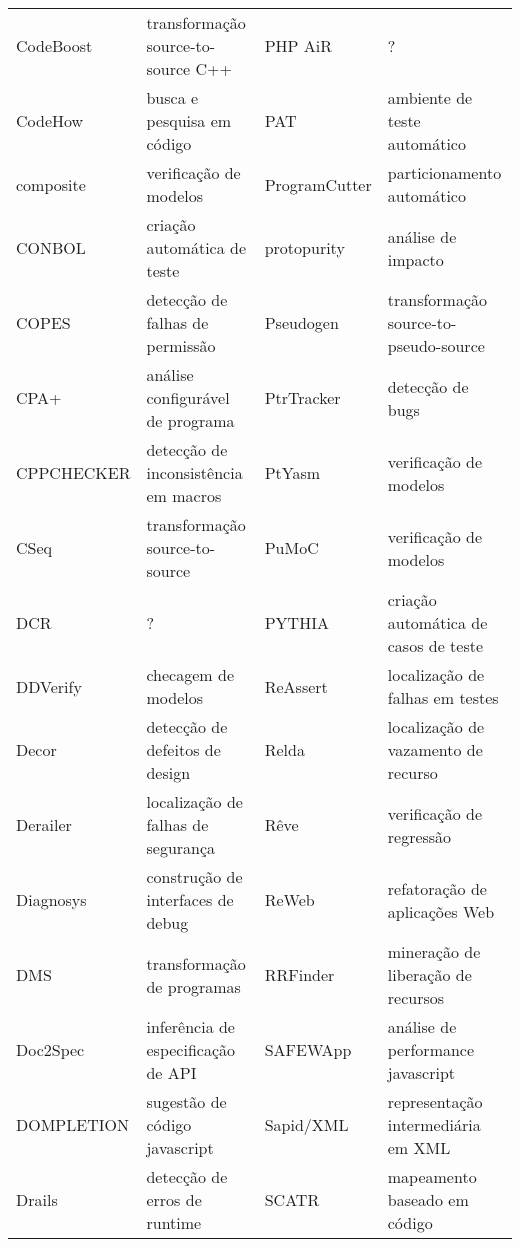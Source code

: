 \begin{table}[h]
{\begin{tabular}{| l | l | l | l |}
  CodeBoost      & transformação source-to-source C++   & PHP AiR          & ?                                    \\
  CodeHow        & busca e pesquisa em código           & PAT              & ambiente de teste automático         \\
  composite      & verificação de modelos               & ProgramCutter    & particionamento automático           \\
  CONBOL         & criação automática de teste          & protopurity      & análise de impacto                   \\
  COPES          & detecção de falhas de permissão      & Pseudogen        & transformação source-to-pseudo-source \\
  CPA+           & análise configurável de programa     & PtrTracker       & detecção de bugs                     \\
  CPPCHECKER     & detecção de inconsistência em macros & PtYasm           & verificação de modelos               \\
  CSeq           & transformação source-to-source       & PuMoC            & verificação de modelos               \\
  DCR            & ?                                    & PYTHIA           & criação automática de casos de teste \\
  DDVerify       & checagem de modelos                  & ReAssert         & localização de falhas em testes      \\
  Decor          & detecção de defeitos de design       & Relda            & localização de vazamento de recurso  \\
  Derailer       & localização de falhas de segurança   & Rêve             & verificação de regressão             \\
  Diagnosys      & construção de interfaces de debug    & ReWeb            & refatoração de aplicações Web        \\
  DMS            & transformação de programas           & RRFinder         & mineração de liberação de recursos   \\
  Doc2Spec       & inferência de especificação de API   & SAFEWApp         & análise de performance javascript    \\
  DOMPLETION     & sugestão de código javascript        & Sapid/XML        & representação intermediária em XML   \\
  Drails         & detecção de erros de runtime         & SCATR            & mapeamento baseado em código         \\

\end{tabular}}
\end{table}
